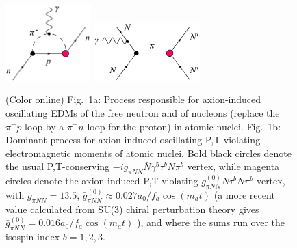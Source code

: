 \begin{figure}[h!]
\begin{center}
\includegraphics[width=3.3cm]{gfx/axions/nEDM_soft_pion_limit_NEW.png}
\includegraphics[width=4.1cm]{gfx/axions/Pion_nucleon_PT-odd_NEW.png}
\caption{(Color online) Fig.~1a: Process responsible for axion-induced oscillating EDMs of the free neutron and of nucleons (replace the $\pi^{-} p$ loop by a $\pi^{+} n$ loop for the proton) in atomic nuclei.
Fig.~1b: Dominant process for axion-induced oscillating P,T-violating electromagnetic moments of atomic nuclei.
Bold black circles denote the usual P,T-conserving $- i g_{\pi N N}  \bar{N}  \gamma^5 \tau^b N \pi^b$ vertex, while magenta circles denote the axion-induced P,T-violating $\bar{g}_{\pi N N}^{(0)} \bar{N} \tau^b N \pi^b$ vertex, with $g_{\pi NN} = 13.5$, $\bar{g}_{\pi N N}^{(0)} \approx 0.027 a_0/f_a \cos(m_a t)$ \cite{Witten1979} (a more recent value calculated from SU(3) chiral perturbation theory gives $\bar{g}_{\pi N N}^{(0)} =0.016 a_0/f_a \cos(m_a t)$ \cite{Mereghetti2015}), and where the sums run over the isospin index $b=1,2,3$.  }
\end{center}
\end{figure}


